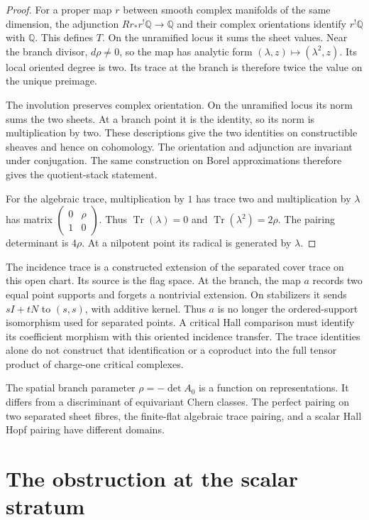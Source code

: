 \begin{proof}
For a proper map $r$ between smooth complex manifolds of the same
dimension, the adjunction $Rr_*r^!\mathbb Q\to\mathbb Q$ and their
complex orientations identify $r^!\mathbb Q$ with $\mathbb Q$.
This defines $T$. On the unramified locus it sums the sheet values.
Near the branch divisor, $d\rho\ne0$, so the map has analytic form
$(\lambda,z)\mapsto(\lambda^2,z)$.
Its local oriented degree is two. Its trace at the branch is
therefore twice the value on the unique preimage.

The involution preserves complex orientation. On the unramified
locus its norm sums the two sheets. At a branch point it is the
identity, so its norm is multiplication by two. These descriptions
give the two identities on constructible sheaves and hence on
cohomology. The orientation and adjunction are invariant under
conjugation. The same construction on Borel approximations therefore
gives the quotient-stack statement.

For the algebraic trace, multiplication by $1$ has trace two and
multiplication by $\lambda$ has matrix
$\left(\begin{smallmatrix}0&\rho\\1&0\end{smallmatrix}\right)$.
Thus $\operatorname{Tr}(\lambda)=0$ and
$\operatorname{Tr}(\lambda^2)=2\rho$. The pairing determinant is
$4\rho$. At a nilpotent point its radical is generated by $\lambda$.
\end{proof}

The incidence trace is a constructed extension of the separated
cover trace on this open chart. Its source is the flag space.
At the branch, the map $a$ records two equal point supports and
forgets a nontrivial extension. On stabilizers it sends
$sI+tN$ to $(s,s)$, with additive kernel. Thus $a$ is no longer
the ordered-support isomorphism used for separated points.
A critical Hall comparison must identify its coefficient morphism
with this oriented incidence transfer. The trace identities alone
do not construct that identification or a coproduct into the full
tensor product of charge-one critical complexes.

The spatial branch parameter $\rho=-\det A_0$ is a function on
representations. It differs from a discriminant of equivariant
Chern classes. The perfect pairing on two separated sheet fibres,
the finite-flat algebraic trace pairing, and a scalar Hall Hopf
pairing have different domains.

\section{The obstruction at the scalar stratum}
\label{sec:c3-collision-obstruction}

